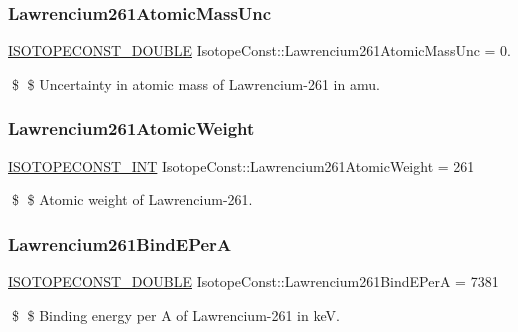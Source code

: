 \subsubsection{\texorpdfstring{Lawrencium261\+Atomic\+Mass\+Unc}{Lawrencium261AtomicMassUnc}}
{\footnotesize\ttfamily \mbox{\hyperlink{group___isotope_const-_macros_ga8f45a7272ce02c0b4c65c44636ed719a}{I\+S\+O\+T\+O\+P\+E\+C\+O\+N\+S\+T\+\_\+\+D\+O\+U\+B\+LE}} Isotope\+Const\+::\+Lawrencium261\+Atomic\+Mass\+Unc = 0.}

\$ \$ Uncertainty in atomic mass of Lawrencium-\/261 in amu. \mbox{\label{group___isotope_const-_lawrencium-_lr261_ga25dfee4c5312448f29160ed284c2e975}} 
\subsubsection{\texorpdfstring{Lawrencium261\+Atomic\+Weight}{Lawrencium261AtomicWeight}}
{\footnotesize\ttfamily \mbox{\hyperlink{group___isotope_const-_macros_ga5f18360b3e99483a35c32d789e62621c}{I\+S\+O\+T\+O\+P\+E\+C\+O\+N\+S\+T\+\_\+\+I\+NT}} Isotope\+Const\+::\+Lawrencium261\+Atomic\+Weight = 261}

\$ \$ Atomic weight of Lawrencium-\/261. \mbox{\label{group___isotope_const-_lawrencium-_lr261_ga5a7074b045aa5d1c4ba4c15fa7401719}} 
\subsubsection{\texorpdfstring{Lawrencium261\+Bind\+E\+PerA}{Lawrencium261BindEPerA}}
{\footnotesize\ttfamily \mbox{\hyperlink{group___isotope_const-_macros_ga8f45a7272ce02c0b4c65c44636ed719a}{I\+S\+O\+T\+O\+P\+E\+C\+O\+N\+S\+T\+\_\+\+D\+O\+U\+B\+LE}} Isotope\+Const\+::\+Lawrencium261\+Bind\+E\+PerA = 7381}

\$ \$ Binding energy per A of Lawrencium-\/261 in keV. \mbox{\label{group___isotope_const-_lawrencium-_lr261_gab4b121b40181c3978c13e000ed99eee9}} 
